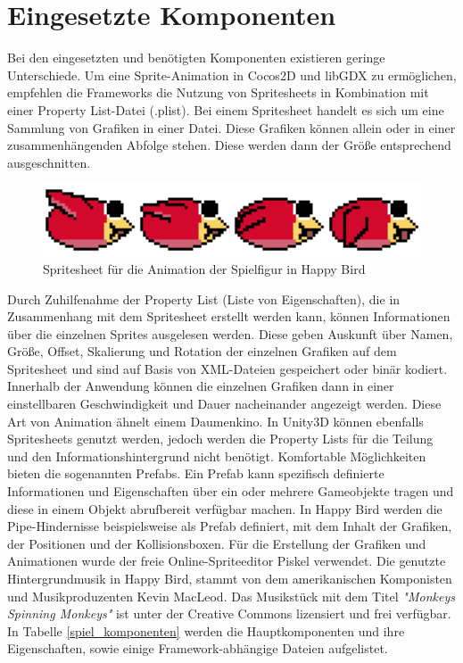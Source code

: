 \section{Eingesetzte Komponenten}
\label{sec:eingesetze_komponenten}
Bei den eingesetzten und benötigten Komponenten existieren geringe Unterschiede. Um eine Sprite-Animation in Cocos2D und libGDX zu ermöglichen, empfehlen die Frameworks die Nutzung von Spritesheets in Kombination mit einer Property List-Datei (.plist). Bei einem Spritesheet handelt es sich um eine Sammlung von Grafiken in einer Datei. Diese Grafiken können allein oder in einer zusammenhängenden Abfolge stehen. Diese werden dann der Größe entsprechend ausgeschnitten.

\begin{figure}[htbp]
	\centering
	\includegraphics[width=1.0\textwidth]{bilder/Red_Bird}
	\caption{Spritesheet für die Animation der Spielfigur in Happy Bird}\label{spritesheet}
\end{figure}

Durch Zuhilfenahme der Property List (Liste von Eigenschaften), die in Zusammenhang mit dem Spritesheet erstellt werden kann, können Informationen über die einzelnen Sprites ausgelesen werden. Diese geben Auskunft über Namen, Größe, Offset, Skalierung und Rotation der einzelnen Grafiken auf dem Spritesheet und sind auf Basis von XML-Dateien gespeichert oder binär kodiert. Innerhalb der Anwendung können die einzelnen Grafiken dann in einer einstellbaren Geschwindigkeit und Dauer nacheinander angezeigt werden. Diese Art von Animation ähnelt einem Daumenkino.
In Unity3D können ebenfalls Spritesheets genutzt werden, jedoch werden die Property Lists für die Teilung und den Informationshintergrund nicht benötigt. Komfortable Möglichkeiten bieten die sogenannten Prefabs. Ein Prefab kann spezifisch definierte Informationen und Eigenschaften über ein oder mehrere Gameobjekte tragen und diese in einem Objekt abrufbereit verfügbar machen. In Happy Bird werden die Pipe-Hindernisse beispielsweise als Prefab definiert, mit dem Inhalt der Grafiken, der Positionen und der Kollisionsboxen.
Für die Erstellung der Grafiken und Animationen wurde der freie Online-Spriteeditor Piskel verwendet. \citep{piskel}
Die genutzte Hintergrundmusik in Happy Bird, stammt von dem amerikanischen Komponisten und Musikproduzenten Kevin MacLeod. Das Musikstück mit dem Titel \emph{"Monkeys Spinning Monkeys"} ist unter der Creative Commons lizensiert und frei verfügbar. \citep{macLeod}
In Tabelle \ref{spiel_komponenten} werden die Hauptkomponenten und ihre Eigenschaften, sowie einige Framework-abhängige Dateien aufgelistet.

